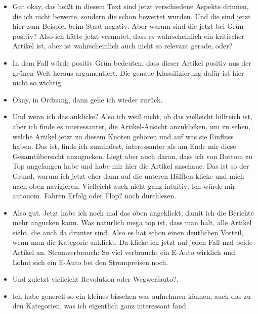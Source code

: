 {\begin{itemize}[]
                  Von daher hätte ich das jetzt einfach angeklickt, weil es halt am interessantesten klingt.
            \item {} Gut okay, das heißt in diesem Text sind jetzt verschiedene Aspekte drinnen, die ich nicht bewerte, sondern die schon bewertet wurden.
                  Und die sind jetzt hier zum Beispiel beim Staat negativ.
                  Aber warum sind die jetzt bei Grün positiv?
                  Also ich hätte jetzt vermutet, dass es wahrscheinlich ein kritischer Artikel ist, aber ist wahrscheinlich auch nicht so relevant gerade, oder?
            \item {} In dem Fall würde positiv Grün bedeuten, dass dieser Artikel positiv aus der grünen Welt heraus argumentiert.
                  Die genaue Klassifizierung dafür ist hier nicht so wichtig.
            \item {} Okay, in Ordnung, dann gehe ich wieder zurück.
            \item {} Und wenn ich das anklicke?
                  Also ich weiß nicht, ob das vielleicht hilfreich ist, aber ich finde es interessanter, die Artikel-Ansicht anzuklicken, um zu sehen, welche Artikel jetzt zu diesem Knoten gehören und auf was sie Einfluss haben.
                  Das ist, finde ich zumindest, interessanter als am Ende mir diese Gesamtübersicht anzugucken.
                  Liegt aber auch daran, dass ich von Bottom zu Top angefangen habe und habe mir hier die Artikel anschaue.
                  Das ist so der Grund, warum ich jetzt eher dann auf die unteren Hälften klicke und mich nach oben navigieren.
                  Vielleicht auch nicht ganz intuitiv.
                  Ich würde mir \flqq autonom. Fahren Erfolg oder Flop?\frqq{} noch durchlesen.
            \item {} Also gut. Jetzt habe ich noch mal das oben angeklickt, damit ich die Berichte mehr angucken kann.
                  Was natürlich mega top ist, dass man halt, alle Artikel sieht, die auch da drunter sind.
                  Also es hat schon einen deutlichen Vorteil, wenn man die Kategorie anklickt.
                  Da klicke ich jetzt auf jeden Fall mal beide Artikel an.
                  \flqq Stromverbrauch: So viel verbraucht ein E-Auto wirklich\frqq{} und \flqq Lohnt sich ein E-Auto bei den Strompreisen noch\frqq{}.
            \item {} Und zuletzt vielleicht \flqq Revolution oder Wegwerfauto?\frqq{}.
            \item {} Ich habe generell so ein kleines bisschen was aufnehmen können, auch das zu den Kategorien, was ich eigentlich ganz interessant fand.

\end{itemize}}
